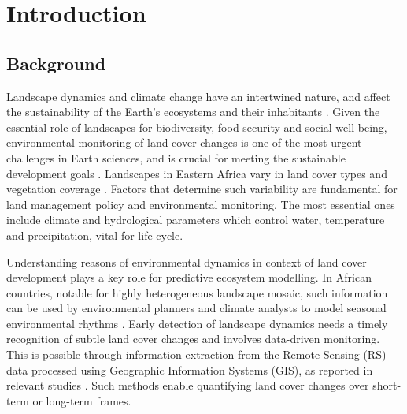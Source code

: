 \documentclass[sn-mathphys-num]{sn-jnl}%
\theoremstyle{thmstyleone}%
\theoremstyle{thmstyletwo}%
\theoremstyle{thmstylethree}%
\begin{document}

\maketitle

\section{Introduction}\label{sec1}

\subsection{Background}

Landscape dynamics and climate change have an intertwined nature, and affect the sustainability of the Earth's ecosystems and their inhabitants \cite{Conradi,atmos16040466,Ramachandra}. Given the essential role of landscapes for biodiversity, food security and social well-being, environmental monitoring of land cover changes is one of the most urgent challenges in Earth sciences, and is crucial for meeting the sustainable development goals \cite{Liuetal,Gao,geohazards6030058}. Landscapes in Eastern Africa vary in land cover types and vegetation coverage \cite{Lane,Lemenkova202206,Admas,Lemenkova202220,Jonas,Lemenkova202401,analytics2030040}. Factors that determine such variability are fundamental for land management policy and environmental monitoring. The most essential ones include climate and hydrological parameters which control water, temperature and precipitation, vital for life cycle.
 
Understanding reasons of environmental dynamics in context of land cover development plays a key role for predictive ecosystem modelling. In African countries, notable for highly heterogeneous landscape mosaic, such information can be used by environmental planners and climate analysts to model seasonal environmental rhythms \cite{Reiner2023}. Early detection of landscape dynamics needs a timely recognition of subtle land cover changes and involves data-driven monitoring. This is possible through information extraction from the Remote Sensing (RS) data processed using Geographic Information Systems (GIS), as reported in relevant studies \cite{w17182744,Gui,jimaging11080249,w17152317,Lemenkova202501}. Such methods enable quantifying land cover changes over short-term or long-term frames.
\end{document}
